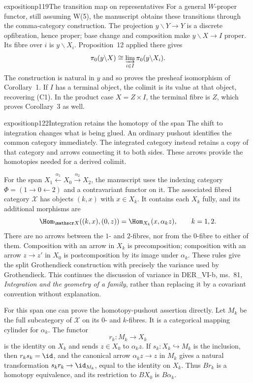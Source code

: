 \begin{dcomment}{exposition}{p119}{The transition map on representatives}
For a general $W$-proper functor, still assuming W(5), the manuscript obtains these transitions through the comma-category construction. The projection $y\backslash Y\to Y$ is a discrete opfibration, hence proper; base change and composition make $y\backslash X\to I$ proper. Its fibre over $i$ is $y\backslash X_i$. Proposition~12 applied there gives
\[
 \pi_0(y\backslash X)
   \cong\varinjlim_{i\in I}\pi_0(y\backslash X_i).
\]
The construction is natural in $y$ and so proves the presheaf isomorphism of Corollary~1. If $I$ has a terminal object, the colimit is its value at that object, recovering (C1). In the product case $X=Z\times I$, the terminal fibre is $Z$, which proves Corollary~3 as well.
\end{dcomment}

\begin{dcomment}{exposition}{p122}{Integration retains the homotopy of the span}
The shift to integration changes what is being glued. An ordinary pushout identifies the common category immediately. The integrated category instead retains a copy of that category and arrows connecting it to both sides. These arrows provide the homotopies needed for a derived colimit.

For the span $X_1\xleftarrow{\alpha_1}X_0\xrightarrow{\alpha_2}X_2$, the manuscript uses the indexing category $\Phi=(1\to0\leftarrow2)$ and a contravariant functor on it. The associated fibred category $\mathscr X$ has objects $(k,x)$ with $x\in X_k$. It contains each $X_k$ fully, and its additional morphisms are
\[
 \Hom_{\mathscr X}((k,x),(0,z))
   =\Hom_{X_k}(x,\alpha_kz),\qquad k=1,2.
\]
There are no arrows between the $1$- and $2$-fibres, nor from the $0$-fibre to either of them. Composition with an arrow in $X_k$ is precomposition; composition with an arrow $z\to z'$ in $X_0$ is postcomposition by its image under $\alpha_k$. These rules give the split Grothendieck construction with precisely the variance used by Grothendieck. This continues the discussion of variance in DER\_VI-b, ms.~81, \emph{Integration and the geometry of a family}, rather than replacing it by a covariant convention without explanation.

For this span one can prove the homotopy-pushout assertion directly. Let $M_k$ be the full subcategory of $\mathscr X$ on its $0$- and $k$-fibres. It is a categorical mapping cylinder for $\alpha_k$. The functor
\[
 r_k:M_k\longrightarrow X_k
\]
is the identity on $X_k$ and sends $z\in X_0$ to $\alpha_kz$. If $s_k:X_k\hookrightarrow M_k$ is the inclusion, then $r_ks_k=\id$, and the canonical arrow $\alpha_kz\to z$ in $M_k$ gives a natural transformation $s_kr_k\to\id_{M_k}$, equal to the identity on $X_k$. Thus $Br_k$ is a homotopy equivalence, and its restriction to $BX_0$ is $B\alpha_k$.


\end{dcomment}
